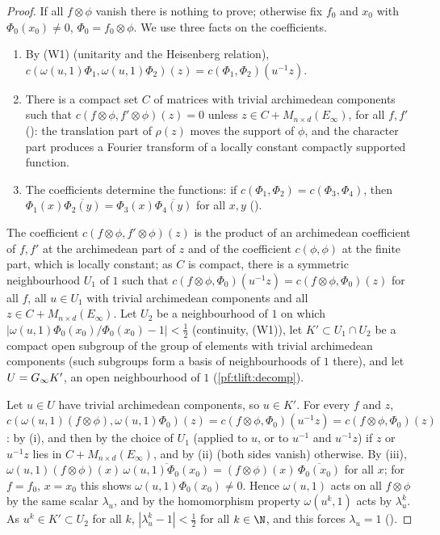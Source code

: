 \begin{proof}
If all $f\otimes\phi$ vanish there is nothing to prove; otherwise fix $f_0$ and $x_0$ with $\Phi_0(x_0)\ne0$, $\Phi_0=f_0\otimes\phi$. We use
three facts on the coefficients.
\begin{enumerate}[label=(\roman*),nosep]
\item By (W1) (unitarity and the Heisenberg relation),
  $c(\omega(u,1)\Phi_1,\omega(u,1)\Phi_2)(z)=c(\Phi_1,\Phi_2)(u^{-1}z)$.
\item There is a compact set $C$ of matrices with trivial archimedean components such that $c(f\otimes\phi,f'\otimes\phi)(z)=0$ unless
  $z\in C+M_{n\times d}(E_\infty)$, for all $f,f'$ (): the translation part of $\rho(z)$ moves the
  support of $\phi$, and the character part produces a Fourier transform of a locally constant compactly supported function.
\item The coefficients determine the functions: if $c(\Phi_1,\Phi_2)=c(\Phi_3,\Phi_4)$, then $\Phi_1(x)\overline{\Phi_2(y)}=\Phi_3(x)\overline{\Phi_4(y)}$
  for all $x,y$ ().
\end{enumerate}
The coefficient $c(f\otimes\phi,f'\otimes\phi)(z)$ is the product of an archimedean coefficient of $f,f'$ at the archimedean part of $z$ and of
the coefficient $c(\phi,\phi)$ at the finite part, which is locally constant; as $C$ is compact, there is a symmetric neighbourhood
$U_1$ of $1$ such that $c(f\otimes\phi,\Phi_0)(u^{-1}z)=c(f\otimes\phi,\Phi_0)(z)$ for all $f$, all $u\in U_1$ with trivial archimedean components and
all $z\in C+M_{n\times d}(E_\infty)$. Let $U_2$ be a neighbourhood of $1$ on which $|\omega(u,1)\Phi_0(x_0)/\Phi_0(x_0)-1|<\frac12$ (continuity, (W1)),
let $K'\subset U_1\cap U_2$ be a compact open subgroup of the group of elements with trivial archimedean components (such
subgroups form a basis of neighbourhoods of $1$ there),
and let $U=G_\infty K'$, an open neighbourhood of $1$ (\cref{pf:tlift:decomp}).

Let $u\in U$ have trivial archimedean components, so $u\in K'$. For every $f$ and $z$, $c(\omega(u,1)(f\otimes\phi),\omega(u,1)\Phi_0)(z)=
c(f\otimes\phi,\Phi_0)(u^{-1}z)=c(f\otimes\phi,\Phi_0)(z)$: by (i), and then by the choice of $U_1$ (applied to $u$, or to $u^{-1}$ and
$u^{-1}z$) if $z$ or $u^{-1}z$ lies in $C+M_{n\times d}(E_\infty)$, and by (ii) (both sides vanish) otherwise. By (iii),
$\omega(u,1)(f\otimes\phi)(x)\,\overline{\omega(u,1)\Phi_0(x_0)}=(f\otimes\phi)(x)\,\overline{\Phi_0(x_0)}$ for all $x$; for $f=f_0$, $x=x_0$ this shows
$\omega(u,1)\Phi_0(x_0)\ne0$. Hence $\omega(u,1)$ acts on all $f\otimes\phi$ by the same scalar $\lambda_u$, and by the homomorphism property
$\omega(u^k,1)$ acts by $\lambda_u^k$. As $u^k\in K'\subset U_2$ for all $k$, $|\lambda_u^k-1|<\frac12$ for all $k\in\N$, and this forces $\lambda_u=1$
().
\end{proof}

